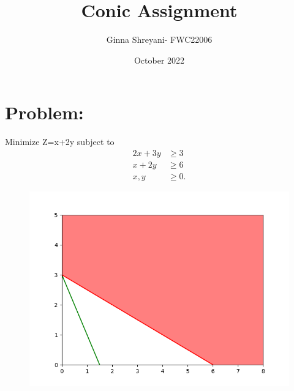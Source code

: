 \documentclass[a4paper,12pt,twocolumn]{article}
\title{Conic Assignment}
\author{Ginna Shreyani- FWC22006}
\date{October 2022}
\begin{document}
\maketitle											
\section{Problem:}
\fi
Minimize Z=x+2y subject to
\begin{align}
	2x+3y&\ge3
	\\
	x+2y&\ge6
	\\
	x,y&\ge0.
\end{align}
\solution
	\begin{figure}[!ht]
		\centering
		\includegraphics[width=\columnwidth]{12/12/1/6/figs/optimize.png}
		\caption{}
		\label{fig:12/12/1/6}
  	\end{figure}
	\iffalse
\maketitle
\end{document}
